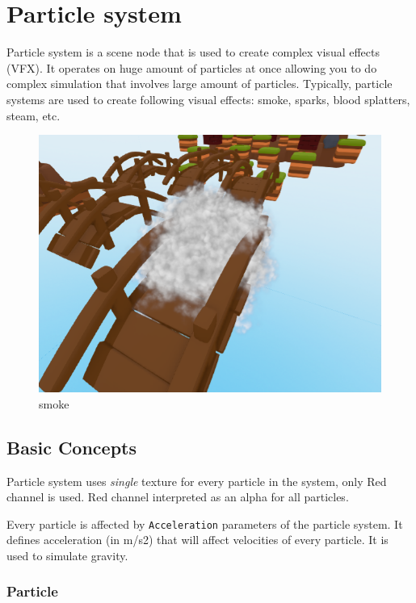 \documentclass[
]{book}
\theoremstyle{definition}
\theoremstyle{definition}
\theoremstyle{definition}
\theoremstyle{definition}
\theoremstyle{remark}
\begin{document}
\section{Particle system}\label{particle-system}

Particle system is a scene node that is used to create complex visual effects (VFX). It operates on huge amount of particles at once allowing you to do complex simulation that involves large amount of particles. Typically, particle systems are used to create following visual effects: smoke, sparks, blood splatters, steam, etc.

\begin{figure}
\centering
\includegraphics{images/scene_particle_system_example.png}
\caption{smoke}
\end{figure}

\subsection{Basic Concepts}\label{basic-concepts-1}

Particle system uses \emph{single} texture for every particle in the system, only Red channel is used. Red channel interpreted as an alpha for all particles.

Every particle is affected by \texttt{Acceleration} parameters of the particle system. It defines acceleration (in m/s2) that will affect velocities of every particle. It is used to simulate gravity.

\subsubsection{Particle}\label{particle}
\end{document}
